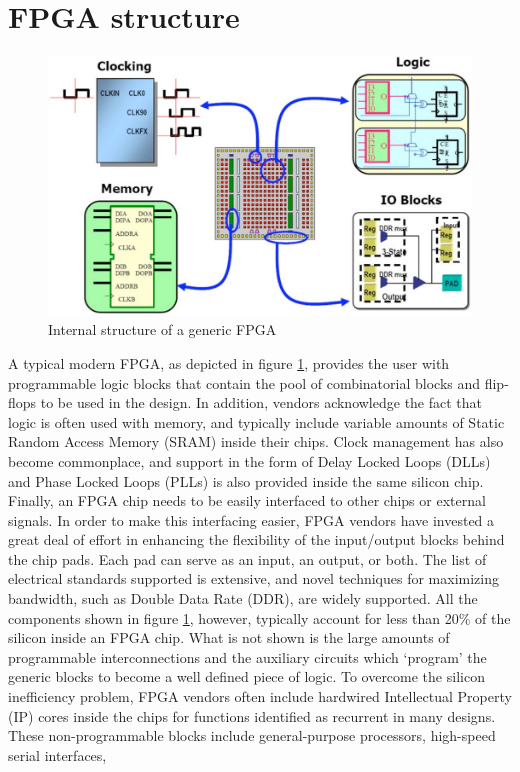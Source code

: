 \section{FPGA structure}
\begin{figure}[H]
	\centering
	\includegraphics[width=0.7\linewidth]{IMG/ch3/FPGA2}
	\caption{Internal structure of a generic FPGA}
	\label{fig:fpga2}
\end{figure}
\noindent A typical modern FPGA, as depicted in figure \ref{fig:fpga2}, provides the user with programmable logic blocks that
contain the pool of combinatorial blocks and flip-flops to be used in the design. In addition, vendors
acknowledge the fact that logic is often used with memory, and typically include
variable amounts of Static Random Access Memory (SRAM) inside their chips. Clock management has
also become commonplace, and support in the form of Delay Locked Loops (DLLs) and Phase Locked
Loops (PLLs) is also provided inside the same silicon chip. Finally, an FPGA chip needs to be easily interfaced to other chips or
external signals. In order to make this interfacing easier, FPGA vendors have invested a great deal of
effort in enhancing the flexibility of the input/output blocks behind the chip pads. Each pad can serve
as an input, an output, or both. The list of electrical standards supported is extensive, and novel
techniques for maximizing bandwidth, such as Double Data Rate (DDR), are widely supported.
\newline
All the components shown in figure \ref{fig:fpga2}, however, typically account for less than 20\% of the silicon
inside an FPGA chip. What is not shown is the large amounts of programmable interconnections and the
auxiliary circuits which ‘program’ the generic blocks to become a well defined piece of logic.
To overcome the silicon inefficiency problem, FPGA vendors often include hardwired
Intellectual Property (IP) cores inside the chips for functions identified as recurrent in many designs.
These non-programmable blocks include general-purpose processors, high-speed serial interfaces,
